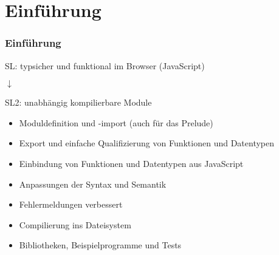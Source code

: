 \section{Einführung}

\begin{frame}
\frametitle{Einführung}
SL: typsicher und funktional im Browser (JavaScript)

\begin{center}
$\downarrow$
\end{center}

SL2: unabhängig kompilierbare Module

\begin{itemize}
\item Moduldefinition und -import (auch für das Prelude)
\item Export und einfache Qualifizierung von Funktionen und
    Datentypen
\item Einbindung von Funktionen und Datentypen aus JavaScript
\item Anpassungen der Syntax und Semantik
\item Fehlermeldungen verbessert
\item Compilierung ins Dateisystem
\item Bibliotheken, Beispielprogramme und Tests
\end{itemize}
\end{frame}